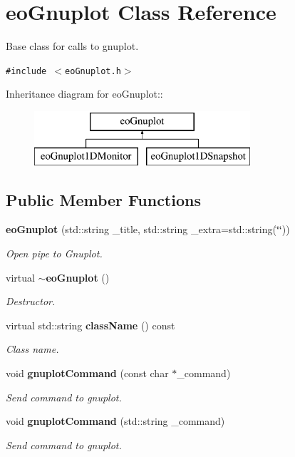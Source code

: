 \section{eo\-Gnuplot Class Reference}
\label{classeo_gnuplot}
Base class for calls to gnuplot.  


{\tt \#include $<$eo\-Gnuplot.h$>$}

Inheritance diagram for eo\-Gnuplot::\begin{figure}[H]
\begin{center}
\leavevmode
\includegraphics[height=2cm]{classeo_gnuplot}
\end{center}
\end{figure}
\subsection*{Public Member Functions}
\begin{CompactItemize}
\item 
{\bf eo\-Gnuplot} (std::string \_\-title, std::string \_\-extra=std::string(\char`\"{}\char`\"{}))
\begin{CompactList}\small\item\em Open pipe to Gnuplot. \item\end{CompactList}\item 
virtual {\bf $\sim$eo\-Gnuplot} ()
\begin{CompactList}\small\item\em Destructor. \item\end{CompactList}\item 
virtual std::string {\bf class\-Name} () const \label{classeo_gnuplot_a2}

\begin{CompactList}\small\item\em Class name. \item\end{CompactList}\item 
void {\bf gnuplot\-Command} (const char $\ast$\_\-command)\label{classeo_gnuplot_a3}

\begin{CompactList}\small\item\em Send command to gnuplot. \item\end{CompactList}\item 
void {\bf gnuplot\-Command} (std::string \_\-command)
\begin{CompactList}\small\item\em Send command to gnuplot. \item\end{CompactList}\end{CompactItemize}
